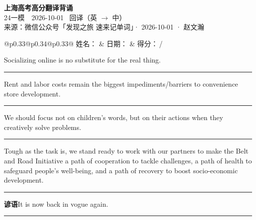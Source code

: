 \documentclass[11pt,a4paper]{article}
\newcommand{\num}[1]{\makebox[1.9em][r]{#1.}\hspace{0.3em}}
\newcommand{\wline}{\noindent\rule{\linewidth}{0.4pt}}
\begin{document}
\pagestyle{plain}
\begin{center}
{\LARGE\bfseries 上海高考高分翻译背诵 }\\[0.25em]
{\large 24一模　2026-10-01 \quad\ 回译（英 $\to$ 中）}\\[0.35em]
{\footnotesize 来源：微信公众号「发现之旅 速来记单词」· 2026-10-01 · 赵文瀚}
\end{center}

\vspace{0.4em}
\noindent\begin{tabular}{@{}p{0.33\textwidth}@{}p{0.34\textwidth}@{}p{0.33\textwidth}@{}}
姓名：\underline{\hspace{2.0cm}} & 日期：\underline{\hspace{2.0cm}} & 得分：\underline{\hspace{1.4cm}}\,/ \\
\end{tabular}

\vspace{0.5em}

\vspace{0.8em}
\num{1}Socializing online is no substitute for the real thing.

\vspace{0.25em}

\wline

\num{2}Rent and labor costs remain the biggest impediments/barriers to convenience store development.

\vspace{0.25em}

\wline

\num{3}We should focus not on children’s words, but on their actions when they creatively solve problems.

\vspace{0.25em}

\wline

\num{4}Tough as the task is, we stand ready to work with our partners to make the Belt and Road Initiative a path of cooperation to tackle challenges, a path of health to safeguard people’s well-being, and a path of recovery to boost socio-economic development.

\vspace{0.25em}

\wline

\vspace{0.4em}\noindent{\color{rulegray}\rule{\textwidth}{0.6pt}}\vspace{0.4em}

\num{5}\textbf{谚语}\quad It is now back in vogue again.

\vspace{0.25em}

\wline
\end{document}
